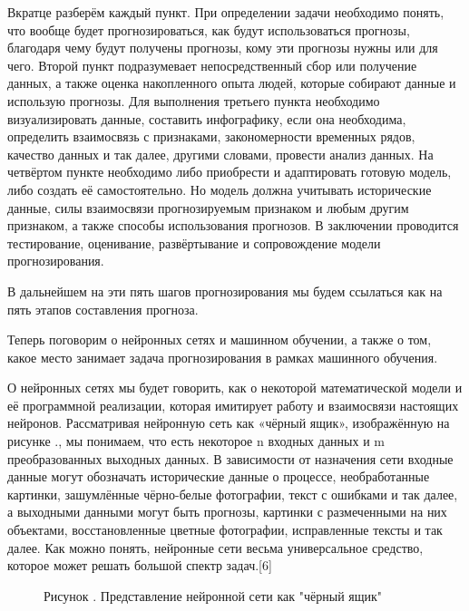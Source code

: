 {	\par \redline Вкратце разберём каждый пункт. При определении задачи необходимо понять, что вообще будет прогнозироваться, как будут использоваться прогнозы, благодаря чему будут получены прогнозы, кому эти прогнозы нужны или для чего. Второй пункт подразумевает непосредственный сбор или получение данных, а также оценка накопленного опыта людей, которые собирают данные и использую прогнозы. Для выполнения третьего пункта необходимо визуализировать данные, составить инфографику, если она необходима, определить взаимосвязь с признаками, закономерности временных рядов, качество данных и так далее, другими словами, провести анализ данных. На четвёртом пункте необходимо либо приобрести и адаптировать готовую модель, либо создать её самостоятельно. Но модель должна учитывать исторические данные, силы взаимосвязи прогнозируемым признаком и любым другим признаком, а также способы использования прогнозов. В заключении проводится тестирование, оценивание, развёртывание и сопровождение модели прогнозирования. 
	
	\par \redline В дальнейшем на эти пять шагов прогнозирования мы будем ссылаться как на пять этапов составления прогноза.
	
	\par \redline Теперь поговорим о нейронных сетях и машинном обучении, а также о том, какое место занимает задача прогнозирования в рамках машинного обучения. 
	
	\par \redline О нейронных сетях мы будет говорить, как о некоторой математической модели и её программной реализации, которая имитирует работу и взаимосвязи настоящих нейронов.  Рассматривая нейронную сеть как «чёрный ящик», изображённую на рисунке \thechaptercntr .\theimagecntr \spc, мы понимаем, что есть некоторое n входных данных и m преобразованных выходных данных. В зависимости от назначения сети входные данные могут обозначать исторические данные о процессе, необработанные картинки, зашумлённые чёрно-белые фотографии, текст с ошибками и так далее, а выходными данными могут быть прогнозы, картинки с размеченными на них объектами, восстановленные цветные фотографии, исправленные тексты и так далее. Как можно понять, нейронные сети весьма универсальное средство, которое может решать большой спектр задач.[6] 
	
	\begin{figure}
		\centering
		\def\svgwidth{\textwidth}
		
		\caption*{\gostFont Рисунок \thechaptercntr .\theimagecntr \spc {--} Представление нейронной сети как "чёрный ящик"}
		\label{fig:NNBlackBox}
	\end{figure} \addtocounter{imagecntr}{1}
	
}
